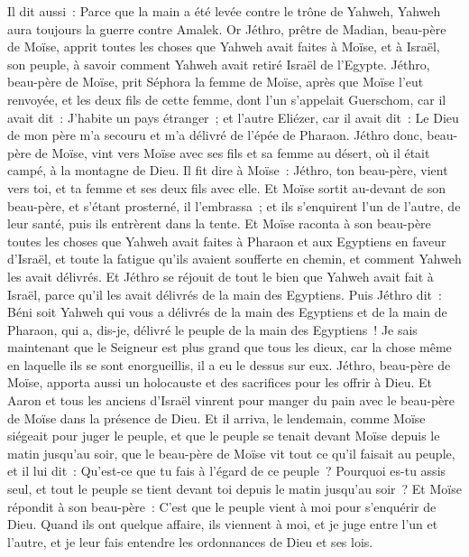 \begin{multicols}{2}
Il dit aussi~: Parce que la main a été levée contre le trône de Yahweh, Yahweh aura toujours la guerre contre Amalek.
\VerseOne{}Or Jéthro, prêtre de Madian, beau-père de Moïse, apprit toutes les choses que Yahweh avait faites à Moïse, et à Israël, son peuple, à savoir comment Yahweh avait retiré Israël de l'Egypte.
Jéthro, beau-père de Moïse, prit Séphora la femme de Moïse, après que Moïse l'eut renvoyée,
et les deux fils de cette femme, dont l'un s'appelait Guerschom, car il avait dit~: J'habite un pays étranger~;
et l'autre Eliézer, car il avait dit~: Le Dieu de mon père m'a secouru et m'a délivré de l'épée de Pharaon.
Jéthro donc, beau-père de Moïse, vint vers Moïse avec ses fils et sa femme au désert, où il était campé, à la montagne de Dieu.
Il fit dire à Moïse~: Jéthro, ton beau-père, vient vers toi, et ta femme et ses deux fils avec elle.
Et Moïse sortit au-devant de son beau-père, et s'étant prosterné, il l'embrassa~; et ils s'enquirent l'un de l'autre, de leur santé, puis ils entrèrent dans la tente.
Et Moïse raconta à son beau-père toutes les choses que Yahweh avait faites à Pharaon et aux Egyptiens en faveur d'Israël, et toute la fatigue qu'ils avaient soufferte en chemin, et comment Yahweh les avait délivrés.
Et Jéthro se réjouit de tout le bien que Yahweh avait fait à Israël, parce qu'il les avait délivrés de la main des Egyptiens.
Puis Jéthro dit~: Béni soit Yahweh qui vous a délivrés de la main des Egyptiens et de la main de Pharaon, qui a, dis-je, délivré le peuple de la main des Egyptiens~!
Je sais maintenant que le Seigneur est plus grand que tous les dieux, car la chose même en laquelle ils se sont enorgueillis, il a eu le dessus sur eux.
Jéthro, beau-père de Moïse, apporta aussi un holocauste et des sacrifices pour les offrir à Dieu. Et Aaron et tous les anciens d'Israël vinrent pour manger du pain avec le beau-père de Moïse dans la présence de Dieu.
Et il arriva, le lendemain, comme Moïse siégeait pour juger le peuple, et que le peuple se tenait devant Moïse depuis le matin jusqu'au soir,
que le beau-père de Moïse vit tout ce qu'il faisait au peuple, et il lui dit~: Qu'est-ce que tu fais à l'égard de ce peuple~? Pourquoi es-tu assis seul, et tout le peuple se tient devant toi depuis le matin jusqu'au soir~?
 Et Moïse répondit à son beau-père~: C'est que le peuple vient à moi pour s'enquérir de Dieu.
Quand ils ont quelque affaire, ils viennent à moi, et je juge entre l'un et l'autre, et je leur fais entendre les ordonnances de Dieu et ses lois.

\end{multicols}
